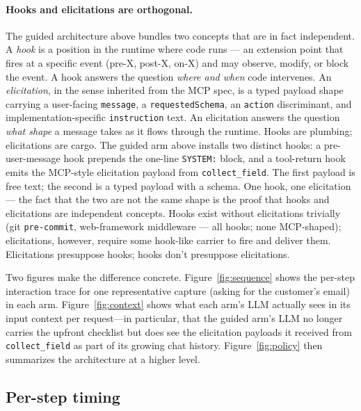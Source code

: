 \documentclass[11pt,a4paper]{article}
\begin{document}
\paragraph{Hooks and elicitations are orthogonal.}
\label{sec:hooks-vs-elicitations}
The guided architecture above bundles two concepts that are in fact independent. A \emph{hook} is a position in the runtime where code runs --- an extension point that fires at a specific event (pre-X, post-X, on-X) and may observe, modify, or block the event. A hook answers the question \emph{where and when} code intervenes. An \emph{elicitation}, in the sense inherited from the MCP spec, is a typed payload shape carrying a user-facing \texttt{message}, a \texttt{requestedSchema}, an \texttt{action} discriminant, and implementation-specific \texttt{instruction} text. An elicitation answers the question \emph{what shape} a message takes as it flows through the runtime. Hooks are plumbing; elicitations are cargo. The guided arm above installs two distinct hooks: a pre-user-message hook prepends the one-line \texttt{SYSTEM:} block, and a tool-return hook emits the MCP-style elicitation payload from \texttt{collect\_field}. The first payload is free text; the second is a typed payload with a schema. One hook, one elicitation --- the fact that the two are not the same shape is the proof that hooks and elicitations are independent concepts. Hooks exist without elicitations trivially (git \texttt{pre-commit}, web-framework middleware --- all hooks; none MCP-shaped); elicitations, however, require some hook-like carrier to fire and deliver them. Elicitations presuppose hooks; hooks don't presuppose elicitations.

Two figures make the difference concrete. Figure~\ref{fig:sequence} shows the per-step interaction trace for one representative capture (asking for the customer's email) in each arm. Figure~\ref{fig:context} shows what each arm's LLM actually sees in its input context per request---in particular, that the guided arm's LLM no longer carries the upfront checklist but does see the elicitation payloads it received from \texttt{collect\_field} as part of its growing chat history. Figure~\ref{fig:policy} then summarizes the architecture at a higher level.

\subsection{Per-step timing}
\end{document}
